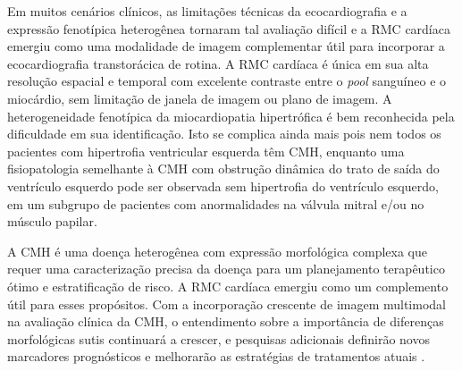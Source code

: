 Em muitos cenários clínicos, as limitações técnicas da ecocardiografia e a expressão fenotípica heterogênea tornaram tal avaliação difícil e a \gls{RMC} cardíaca emergiu como uma modalidade de imagem complementar útil para incorporar a ecocardiografia transtorácica de rotina. A \gls{RMC} cardíaca é única em sua alta resolução espacial e temporal com excelente contraste entre o \textit{pool} sanguíneo e o miocárdio, sem limitação de janela de imagem ou plano de imagem.
A heterogeneidade fenotípica da miocardiopatia hipertrófica é bem reconhecida pela dificuldade em sua identificação. Isto se complica ainda mais pois nem todos os pacientes com hipertrofia ventricular esquerda têm CMH, enquanto uma fisiopatologia semelhante à CMH com obstrução dinâmica do trato de saída do ventrículo esquerdo pode ser observada sem hipertrofia do ventrículo esquerdo, em um subgrupo de pacientes com anormalidades na válvula mitral e/ou no músculo papilar.

A CMH é uma doença heterogênea com expressão morfológica complexa que requer uma caracterização precisa da doença para um planejamento terapêutico ótimo e estratificação de risco. A \gls{RMC} cardíaca emergiu como um complemento útil para esses propósitos. Com a incorporação crescente de imagem multimodal na avaliação clínica da CMH, o entendimento sobre a importância de diferenças morfológicas sutis continuará a crescer, e pesquisas adicionais definirão novos marcadores prognósticos e melhorarão as estratégias de tratamentos atuais \cite{toCardiacMagneticResonance2011c}.





